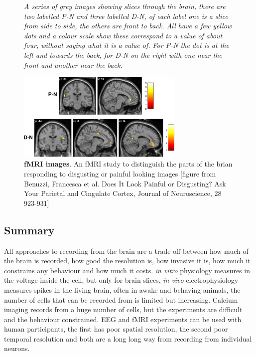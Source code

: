 \documentclass[12pt]{article}
\begin{document}
\begin{figure}
{\textsl{A series of grey images showing slices through the brain, there are two labelled P-N and three labelled D-N, of each label one is a slice from side to side, the others are front to back. All have a few yellow dots and a colour scale show these correspond to a value of about four, without saying what it is a value of. For P-N the dot is at the left and towards the back, for D-N on the right with one near the front and another near the back.}}
{
  \begin{center}
    \includegraphics[width=8cm]{fmri.jpg}
  \end{center}
  }
  \caption{\textbf{fMRI images}. An fMRI study to distinguish the parts of the brian responding to disgusting or painful looking images [figure from Benuzzi, Francesca et al. Does It Look Painful or Disgusting? Ask Your Parietal and Cingulate Cortex, Journal of Neuroscience, 28 923-931]\label{fig:mri}}
\end{figure}

\subsection*{Summary}
All approaches to recording from the brain are a trade-off between how
much of the brain is recorded, how good the resolution is, how
invasive it is, how much it constrains any behaviour and how much it
costs. \textsl{in vitro} physiology measures in the voltage inside the
cell, but only for brain slices, \textsl{in vivo} electrophysiology
measures spikes in the living brain, often in awake and behaving
animals, the number of cells that can be recorded from is limited but
increasing. Calcium imaging records from a huge number of cells, but
the experiments are difficult and the behaviour constrained. EEG and
fMRI experiments can be used with human participants, the first has
poor spatial resolution, the second poor temporal resolution and both
are a long long way from recording from individual neurons.
\end{document}

